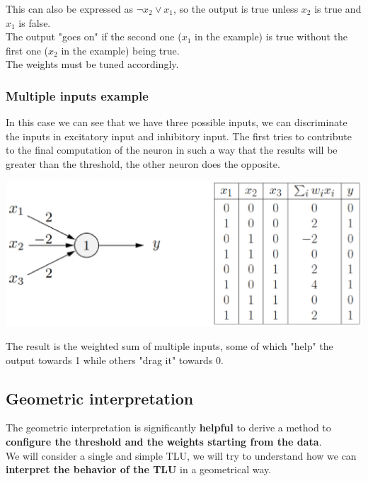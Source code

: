 This can also be expressed as $\neg x_2 \vee x_1$, so the output is true unless $x_2$ is true and $x_1$ is false.\\
The output "goes on" if the second one ($x_1$ in the example) is true without the first one ($x_2$ in the example) being true.\\
The weights must be tuned accordingly.\\

\newpage

\subsubsection{Multiple inputs example}
In this case we can see that we have three possible inputs, we can discriminate the inputs in excitatory input and inhibitory input. The first tries to contribute to the final computation of the neuron in such a way that the results will be greater than the threshold, the other neuron does the opposite.

\begin{center}
	\includegraphics[width=0.85\columnwidth]{img/NN/TLU4}
\end{center}

The result is the weighted sum of multiple inputs, some of which "help" the output towards 1 while others "drag it" towards 0.\\

\newpage

\subsection{Geometric interpretation}
The geometric interpretation is significantly \textbf{helpful} to derive a method to \textbf{configure the threshold and the weights starting from the data}. \\

We will consider a single and simple TLU, we will try to understand how we can \textbf{interpret the behavior of the TLU} in a geometrical way. \\

